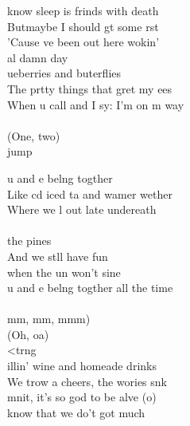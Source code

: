 \begin{cancion}%
	know sleep is frinds with death\\
	Butmaybe I should gt some rst\\
	'Cause ve been out here wokin' \\
	al damn day   \\
	ueberries and buterflies\\
	The prtty things that gret my ees\\
	When u call and I sy: I'm on m way\\
	\jump\\
(One, two)\\jump\\
	\begin{chorus}%
	u and e belng togther\\
	Like cd iced ta and wamer wether\\
	Where we l out late undereath \\
	\jump\\
the pines\\
	And we stll have fun \\
	when the un won't sine\\
	u and e belng togther all the time\\
	\jump\\
	mm, mm, mmm)\\
	(Oh, oa)\\
	<trng\\
	illin' wine and homeade drinks\\
	We trow a cheers, the wories snk\\
	mnit, it's so god to be alve (o)\\
	 know that we do't got much\\

\end{chorus}
\end{cancion}
